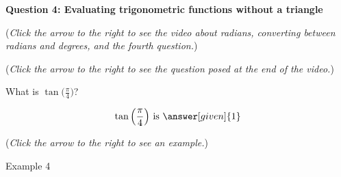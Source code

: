 \documentclass{ximera}
\begin{document}
\textbf{Question 4: Evaluating trigonometric functions
without a triangle}
\begin{question}
\begin{flushright}
{\color{blue}(\emph{Click the arrow to the right to see the video about
radians, converting between radians and degrees, and the fourth question.})}
\end{flushright}
\begin{center}
\begin{expandable}
{\color{blue}(\emph{Click the arrow to the right to see the  question
posed at the end of the video.})}
\begin{expandable}
What is $\tan\Big(\frac{\pi}{4}\Big)$?
\begin{prompt}
\[
\tan\Big(\frac{\pi}{4}\Big)\text{ is }\answer[given]{1}
\]
\end{prompt}
\begin{flushright}
{\color{blue}(\emph{Click the arrow to the right to see an example.})}
\end{flushright}
\begin{expandable}
Example 4
\end{expandable}
\end{expandable}
\end{expandable}
\end{center}
\end{question}
\end{document}

